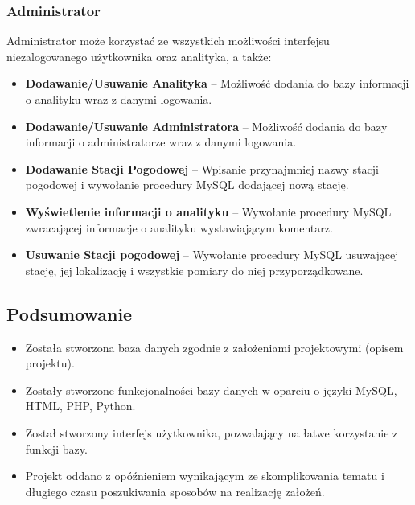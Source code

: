 \documentclass[12pt,a4paper]{article}
\begin{document}
\subsubsection{Administrator}
Administrator może korzystać ze wszystkich możliwości interfejsu niezalogowanego użytkownika oraz analityka, a także:
\begin{itemize}
\item \textbf{Dodawanie/Usuwanie Analityka} -- Możliwość dodania do bazy informacji o analityku wraz z danymi logowania.
\item \textbf{Dodawanie/Usuwanie Administratora} -- Możliwość dodania do bazy informacji o administratorze wraz z danymi logowania.
\item \textbf{Dodawanie Stacji Pogodowej} -- Wpisanie przynajmniej nazwy stacji pogodowej i wywołanie procedury MySQL dodającej nową stację.
\item \textbf{Wyświetlenie informacji o analityku} -- Wywołanie procedury MySQL zwracającej informacje o analityku wystawiającym komentarz.
\item \textbf{Usuwanie Stacji pogodowej} -- Wywołanie procedury MySQL usuwającej stację, jej lokalizację i wszystkie pomiary do niej przyporządkowane.
\end{itemize}
\subsection{Podsumowanie}
\begin{itemize}
\item Została stworzona baza danych zgodnie z założeniami projektowymi (opisem projektu).
\item Zostały stworzone funkcjonalności bazy danych w oparciu o języki MySQL, HTML, PHP, Python.
\item Został stworzony interfejs użytkownika, pozwalający na łatwe korzystanie z funkcji bazy.
\item Projekt oddano z opóźnieniem wynikającym ze skomplikowania tematu i długiego czasu poszukiwania sposobów na realizację założeń.
\end{itemize}
\end{document}
